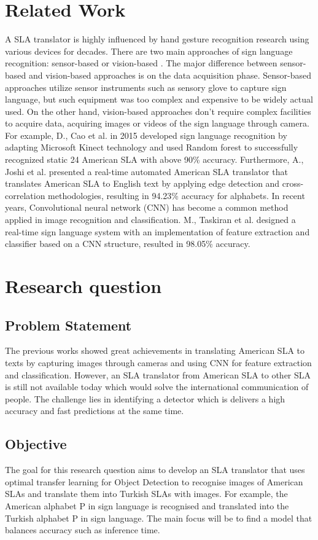 \documentclass[a4paper]{article}
\begin{document}
\section{Related Work}
A SLA translator is highly influenced by hand gesture recognition research using various devices for decades. There are two main approaches of sign language recognition: sensor-based or vision-based \cite{Cheok2019ARO}. The major difference between sensor-based and vision-based approaches is on the data acquisition phase. Sensor-based approaches utilize sensor instruments such as sensory glove to capture sign language, but such equipment was too complex and expensive to be widely actual used. On the other hand, vision-based approaches don't require complex facilities to acquire data, acquiring images or videos of the sign language through camera. For example, D., Cao et al.\cite{7301347} in 2015 developed sign language recognition by adapting Microsoft Kinect technology and used Random forest to successfully recognized static 24 American SLA with above 90\% accuracy. Furthermore, A., Joshi et al.\cite{8088212} presented a real-time automated American SLA translator that translates American SLA to English text by applying edge detection and cross-correlation methodologies, resulting in 94.23\% accuracy for alphabets. In recent years, Convolutional neural network (CNN) has become a common method applied in image recognition and classification. M., Taskiran et al.\cite{8441304} designed a real-time sign language system with an implementation of feature extraction and classifier based on a CNN structure, resulted in 98.05\% accuracy.

\section {Research question}
\subsection{Problem Statement}
The previous works showed great achievements in translating American SLA to texts by capturing images through cameras and using CNN for feature extraction and classification. However, an SLA translator from American SLA to other SLA is still not available today which would solve the international communication of people. The challenge lies in identifying a detector which is delivers a high accuracy and fast predictions at the same time.

\subsection{Objective}
The goal for this research question aims to develop an SLA translator that uses optimal transfer learning for Object Detection to recognise images of American SLAs and translate them into Turkish SLAs with images. For example, the American alphabet P in sign language is recognised and translated into the Turkish alphabet P in sign language. The main focus will be to find a model that balances accuracy such as inference time.
\end{document}

